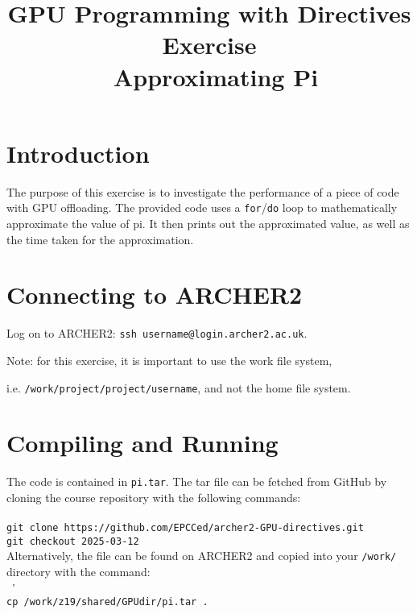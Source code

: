 \documentclass{article}
\title{GPU Programming with Directives Exercise \\\ Approximating Pi}
\author{}
\date{}
\begin{document}
\maketitle

\section{Introduction}

The purpose of this exercise is to investigate the performance of a piece of code with GPU offloading. The provided code uses a \texttt{for}/\texttt{do} loop to mathematically approximate the value of pi. It then prints out the approximated value, as well as the time taken for the approximation. 
 


\section{Connecting to ARCHER2}

Log on to ARCHER2: \texttt{ssh username@login.archer2.ac.uk}. 

\noindent Note: for this exercise, it is important to use the work file system, 

\noindent i.e. \texttt{/work/project/project/username}, and not the home file system.



\section{Compiling and Running}

The code is contained in \texttt{pi.tar}. The tar file can be fetched from GitHub by cloning the course repository with the following commands:
\\~\\
\indent\texttt{git clone https://github.com/EPCCed/archer2-GPU-directives.git} \\
\indent\texttt{git checkout 2025-03-12} \\ 

\noindent Alternatively, the file can be found on ARCHER2 and copied into your \texttt{/work/} directory with the command:
\\~'\\
\indent\texttt{cp /work/z19/shared/GPUdir/pi.tar .} \\
\end{document}
